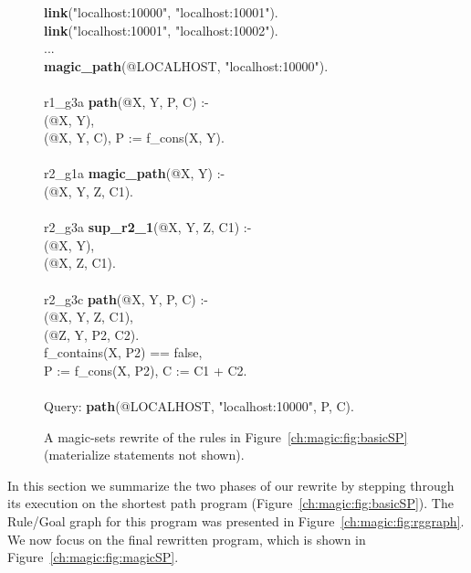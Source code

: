 \begin{figure}[!t]
\ssp
\begin{boxedminipage}{\linewidth}
{\bf link}("localhost:10000", "localhost:10001").\\
{\bf link}("localhost:10001", "localhost:10002").\\
...\\
{\bf magic\_path}(@LOCALHOST, "localhost:10000"). \\
\\
r1\_g3a {\bf path}(@X, Y, P, C) :- \\
(@X, Y), \\
(@X, Y, C), P := f\_cons(X, Y).\\
\\
r2\_g1a {\bf magic\_path}(@X, Y) :- \\
(@X, Y, Z, C1). \\
\\
r2\_g3a {\bf sup\_r2\_1}(@X, Y, Z, C1) :- \\
(@X, Y), \\
(@X, Z, C1). \\
\\
r2\_g3c {\bf path}(@X, Y, P, C) :- \\
(@X, Y, Z, C1), \\
(@Z, Y, P2, C2). \\
\datalogspace f\_contains(X, P2) == false, \\
\datalogspace P := f\_cons(X, P2), C := C1 + C2. \\
\\
Query: {\bf path}(@LOCALHOST, "localhost:10000", P, C).
\end{boxedminipage}
\caption{\label{ch:evita:fig:magicSP}A magic-sets rewrite of
      the rules in Figure~\ref{ch:magic:fig:basicSP} (materialize statements not shown).}
\end{figure}

In this section we summarize the two phases of our rewrite by stepping through
its execution on the shortest path program (Figure~\ref{ch:magic:fig:basicSP}).
The Rule/Goal graph for this program was presented in
Figure~\ref{ch:magic:fig:rggraph}. We now focus on the final rewritten 
program, which is shown in Figure~\ref{ch:magic:fig:magicSP}.

